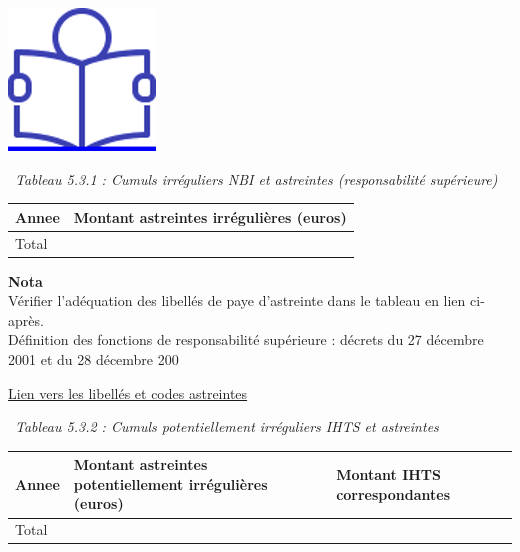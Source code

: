 \href{../Docs/Notices/fiche_astreintes.odt}{\includegraphics{icones/Notice.png}}

~\emph{Tableau 5.3.1 : Cumuls irréguliers NBI et astreintes
(responsabilité supérieure)}

\begin{longtable}[]{@{}ll@{}}
\toprule
Annee & Montant astreintes irrégulières (euros)\tabularnewline
\midrule
\endhead
Total &\tabularnewline
\bottomrule
\end{longtable}

\textbf{Nota}\\
Vérifier l'adéquation des libellés de paye d'astreinte dans le tableau
en lien ci-après.\\
Définition des fonctions de responsabilité supérieure : décrets du 27
décembre 2001 et du 28 décembre 200

\href{../Bases/Reglementation/libelles.astreintes.csv}{Lien vers les
libellés et codes astreintes}

~\emph{Tableau 5.3.2 : Cumuls potentiellement irréguliers IHTS et
astreintes}

\begin{longtable}[]{@{}lll@{}}
\toprule
\begin{minipage}[b]{0.07\columnwidth}\raggedright
Annee\strut
\end{minipage} & \begin{minipage}[b]{0.55\columnwidth}\raggedright
Montant astreintes potentiellement irrégulières (euros)\strut
\end{minipage} & \begin{minipage}[b]{0.29\columnwidth}\raggedright
Montant IHTS correspondantes\strut
\end{minipage}\tabularnewline
\midrule
\endhead
\begin{minipage}[t]{0.07\columnwidth}\raggedright
Total\strut
\end{minipage} & \begin{minipage}[t]{0.55\columnwidth}\raggedright
\strut
\end{minipage} & \begin{minipage}[t]{0.29\columnwidth}\raggedright
\strut
\end{minipage}\tabularnewline
\bottomrule
\end{longtable}

